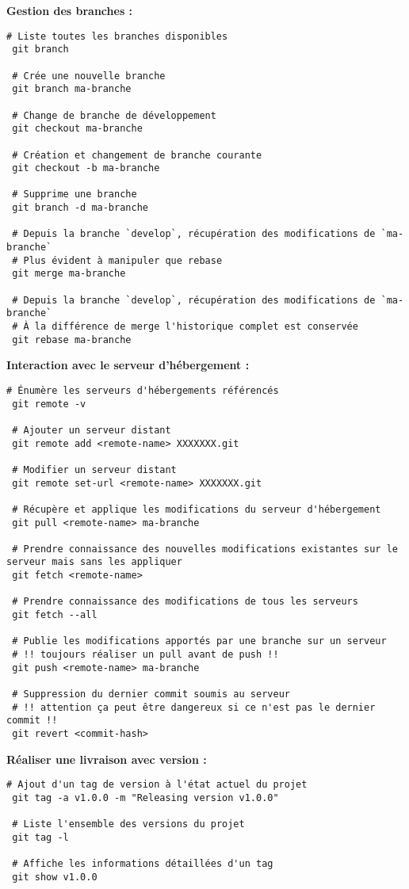 \documentclass[11pt,a4paper,oneside]{article}
\begin{document}
\vspace{4mm}
\textbf{Gestion des branches :}
\begin{lstlisting}[style=custombash]
 # Liste toutes les branches disponibles
 git branch
 
 # Crée une nouvelle branche
 git branch ma-branche

 # Change de branche de développement
 git checkout ma-branche
	
 # Création et changement de branche courante
 git checkout -b ma-branche
 
 # Supprime une branche
 git branch -d ma-branche
 
 # Depuis la branche `develop`, récupération des modifications de `ma-branche`
 # Plus évident à manipuler que rebase
 git merge ma-branche

 # Depuis la branche `develop`, récupération des modifications de `ma-branche`
 # À la différence de merge l'historique complet est conservée
 git rebase ma-branche
\end{lstlisting}

\vspace{4mm}
\textbf{Interaction avec le serveur d'hébergement :}
\begin{lstlisting}[style=custombash]
 # Énumère les serveurs d'hébergements référencés
 git remote -v
 
 # Ajouter un serveur distant
 git remote add <remote-name> XXXXXXX.git

 # Modifier un serveur distant
 git remote set-url <remote-name> XXXXXXX.git

 # Récupère et applique les modifications du serveur d'hébergement
 git pull <remote-name> ma-branche

 # Prendre connaissance des nouvelles modifications existantes sur le serveur mais sans les appliquer
 git fetch <remote-name>

 # Prendre connaissance des modifications de tous les serveurs
 git fetch --all 

 # Publie les modifications apportés par une branche sur un serveur
 # !! toujours réaliser un pull avant de push !!
 git push <remote-name> ma-branche

 # Suppression du dernier commit soumis au serveur
 # !! attention ça peut être dangereux si ce n'est pas le dernier commit !!
 git revert <commit-hash>
\end{lstlisting}

\vspace{4mm}
\textbf{Réaliser une livraison avec version :}
\begin{lstlisting}[style=custombash]
 # Ajout d'un tag de version à l'état actuel du projet
 git tag -a v1.0.0 -m "Releasing version v1.0.0"

 # Liste l'ensemble des versions du projet
 git tag -l

 # Affiche les informations détaillées d'un tag
 git show v1.0.0
\end{lstlisting}
\end{document}
